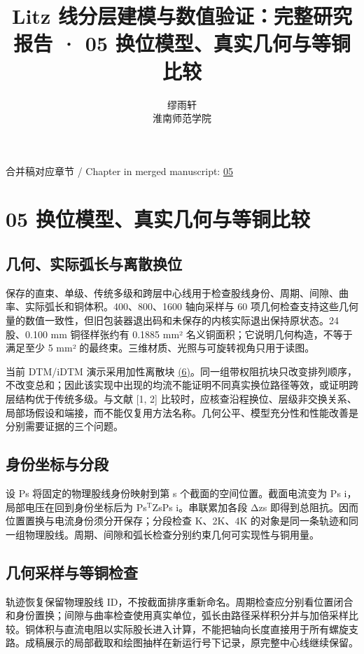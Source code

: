 \documentclass[11pt]{article}
\begin{document}
\title{Litz 线分层建模与数值验证：完整研究报告 · 05 换位模型、真实几何与等铜比较}
\author{缪雨轩\\淮南师范学院}
\date{}
\maketitle
\noindent 合并稿对应章节 / Chapter in merged manuscript: \href{report_zh-CN_single.pdf#chapter-05}{05}\par
\FloatBarrier
\section*{05 换位模型、真实几何与等铜比较}
\hypertarget{chapter-05}{}
\subsection*{几何、实际弧长与离散换位}
\hypertarget{05.geometry.heading}{}
保存的直束、单级、传统多级和跨层中心线用于检查股线身份、周期、间隙、曲率、实际弧长和铜体积。400、800、1600 轴向采样与 60 项几何检查支持这些几何量的数值一致性，但旧包装器退出码和未保存的内核实际退出保持原状态。24 股、0.100 mm 铜径样张约有 0.1885 mm² 名义铜面积；它说明几何构造，不等于满足至少 5 mm² 的最终束。三维材质、光照与可旋转视角只用于读图。


当前 DTM/iDTM 演示采用加性离散块 \href{report_zh-CN_single.pdf#E06}{(6)}。同一组带权阻抗块只改变排列顺序，不改变总和；因此该实现中出现的均流不能证明不同真实换位路径等效，或证明跨层结构优于传统多级。与文献 [1, 2] 比较时，应核查沿程换位、层级非交换关系、局部场假设和端接，而不能仅复用方法名称。几何公平、模型充分性和性能改善是分别需要证据的三个问题。


\subsection*{身份坐标与分段}
\hypertarget{05.dtm_derivation.heading}{}
设 Ps 将固定的物理股线身份映射到第 s 个截面的空间位置。截面电流变为 Ps i，局部电压在回到身份坐标后为 Ps\(^{\mathrm T}\)ZsPs i。串联累加各段 Δzs 即得到总阻抗。因而位置置换与电流身份须分开保存；分段检查 K、2K、4K 的对象是同一条轨迹和同一组物理股线。周期、间隙和弧长检查分别约束几何可实现性与铜用量。


\subsection*{几何采样与等铜检查}
\hypertarget{05.report_geometry.heading}{}
轨迹恢复保留物理股线 ID，不按截面排序重新命名。周期检查应分别看位置闭合和身份置换；间隙与曲率检查使用真实单位，弧长由路径采样积分并与加倍采样比较。铜体积与直流电阻以实际股长进入计算，不能把轴向长度直接用于所有螺旋支路。成稿展示的局部截取和绘图抽样在新运行号下记录，原完整中心线继续保留。
\end{document}
